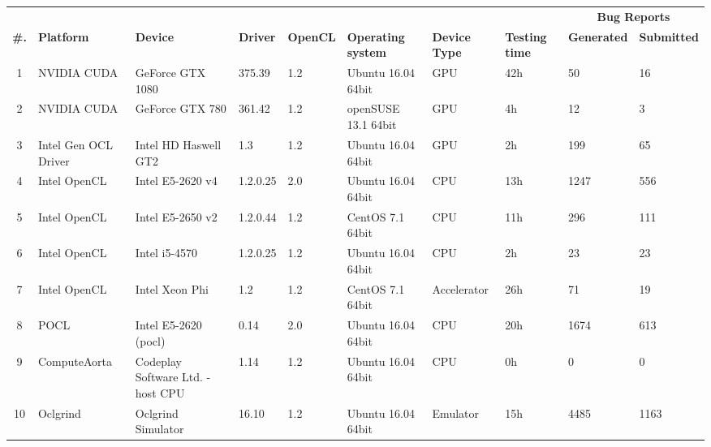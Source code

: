 \begin{tabular}{ clllllll | ll }
\toprule
 & & & & & & & & \multicolumn{2}{c}{\textbf{Bug Reports}} \\
\textbf{\#. } & \textbf{Platform} & \textbf{Device} & \textbf{Driver} & \textbf{OpenCL} & 
\textbf{Operating system} & \textbf{Device Type} & \textbf{Testing time} &
\textbf{Generated} & \textbf{Submitted} \\
\midrule
1 & NVIDIA CUDA & GeForce GTX 1080 & 375.39 & 1.2 & Ubuntu 16.04 64bit & GPU & 42h & 50 & 16 \\
2 & NVIDIA CUDA & GeForce GTX 780 & 361.42 & 1.2 & openSUSE  13.1 64bit & GPU & 4h & 12 & 3 \\
3 & Intel Gen OCL Driver & Intel HD Haswell GT2 & 1.3 & 1.2 & Ubuntu 16.04 64bit & GPU & 2h & 199 & 65 \\
4 & Intel OpenCL & Intel E5-2620 v4 & 1.2.0.25 & 2.0 & Ubuntu 16.04 64bit & CPU & 13h & 1247 & 556 \\
5 & Intel OpenCL & Intel E5-2650 v2 & 1.2.0.44 & 1.2 & CentOS 7.1 64bit & CPU & 11h & 296 & 111 \\
6 & Intel OpenCL & Intel i5-4570 & 1.2.0.25 & 1.2 & Ubuntu 16.04 64bit & CPU & 2h & 23 & 23 \\
7 & Intel OpenCL & Intel Xeon Phi & 1.2 & 1.2 & CentOS 7.1 64bit & Accelerator & 26h & 71 & 19 \\
8 & POCL & Intel E5-2620 (pocl) & 0.14 & 2.0 & Ubuntu 16.04 64bit & CPU & 20h & 1674 & 613 \\
9 & ComputeAorta & Codeplay Software Ltd. - host CPU & 1.14 & 1.2 & Ubuntu 16.04 64bit & CPU & 0h & 0 & 0 \\
10 & Oclgrind & Oclgrind Simulator & 16.10 & 1.2 & Ubuntu 16.04 64bit & Emulator & 15h & 4485 & 1163 \\

\bottomrule
\end{tabular}

